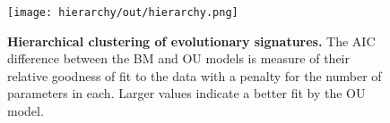 


\begin{figure}[h!]
\texttt{[image: hierarchy/out/hierarchy.png]}
\centering
\caption{\textbf{Hierarchical clustering of evolutionary signatures.}
The AIC difference between the BM and OU models is measure of their relative goodness of fit to the data with a penalty for the number of parameters in each. Larger values indicate a better fit by the OU model.}
\label{fig:hierarchy}
\end{figure}

